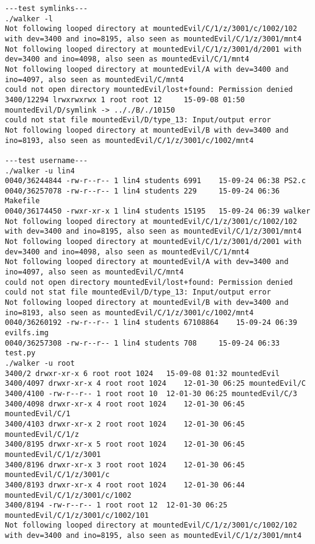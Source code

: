 \documentclass[12pt]{article}
\begin{document}
\begin{lstlisting}
---test symlinks---
./walker -l
Not following looped directory at mountedEvil/C/1/z/3001/c/1002/102 with dev=3400 and ino=8195, also seen as mountedEvil/C/1/z/3001/mnt4
Not following looped directory at mountedEvil/C/1/z/3001/d/2001 with dev=3400 and ino=4098, also seen as mountedEvil/C/1/mnt4
Not following looped directory at mountedEvil/A with dev=3400 and ino=4097, also seen as mountedEvil/C/mnt4
could not open directory mountedEvil/lost+found: Permission denied
3400/12294 lrwxrwxrwx 1 root root 12	 15-09-08 01:50 mountedEvil/D/symlink -> .././B/./10150
could not stat file mountedEvil/D/type_13: Input/output error
Not following looped directory at mountedEvil/B with dev=3400 and ino=8193, also seen as mountedEvil/C/1/z/3001/c/1002/mnt4

---test username---
./walker -u lin4
0040/36244844 -rw-r--r-- 1 lin4 students 6991	 15-09-24 06:38 PS2.c
0040/36257078 -rw-r--r-- 1 lin4 students 229	 15-09-24 06:36 Makefile
0040/36174450 -rwxr-xr-x 1 lin4 students 15195	 15-09-24 06:39 walker
Not following looped directory at mountedEvil/C/1/z/3001/c/1002/102 with dev=3400 and ino=8195, also seen as mountedEvil/C/1/z/3001/mnt4
Not following looped directory at mountedEvil/C/1/z/3001/d/2001 with dev=3400 and ino=4098, also seen as mountedEvil/C/1/mnt4
Not following looped directory at mountedEvil/A with dev=3400 and ino=4097, also seen as mountedEvil/C/mnt4
could not open directory mountedEvil/lost+found: Permission denied
could not stat file mountedEvil/D/type_13: Input/output error
Not following looped directory at mountedEvil/B with dev=3400 and ino=8193, also seen as mountedEvil/C/1/z/3001/c/1002/mnt4
0040/36260192 -rw-r--r-- 1 lin4 students 67108864	 15-09-24 06:39 evilfs.img
0040/36257308 -rw-r--r-- 1 lin4 students 708	 15-09-24 06:33 test.py
./walker -u root
3400/2 drwxr-xr-x 6 root root 1024	 15-09-08 01:32 mountedEvil
3400/4097 drwxr-xr-x 4 root root 1024	 12-01-30 06:25 mountedEvil/C
3400/4100 -rw-r--r-- 1 root root 10	 12-01-30 06:25 mountedEvil/C/3
3400/4098 drwxr-xr-x 4 root root 1024	 12-01-30 06:45 mountedEvil/C/1
3400/4103 drwxr-xr-x 2 root root 1024	 12-01-30 06:45 mountedEvil/C/1/z
3400/8195 drwxr-xr-x 5 root root 1024	 12-01-30 06:45 mountedEvil/C/1/z/3001
3400/8196 drwxr-xr-x 3 root root 1024	 12-01-30 06:45 mountedEvil/C/1/z/3001/c
3400/8193 drwxr-xr-x 4 root root 1024	 12-01-30 06:44 mountedEvil/C/1/z/3001/c/1002
3400/8194 -rw-r--r-- 1 root root 12	 12-01-30 06:25 mountedEvil/C/1/z/3001/c/1002/101
Not following looped directory at mountedEvil/C/1/z/3001/c/1002/102 with dev=3400 and ino=8195, also seen as mountedEvil/C/1/z/3001/mnt4

\end{lstlisting}
\end{document}
